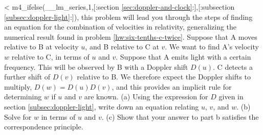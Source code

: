 <%
m4_ifelse(__lm_series,1,[:section \ref{sec:doppler-and-clock}:],[:subsection \ref{subsec:doppler-light}:]),
this problem will lead you through the steps of
finding an equation for the combination of velocities in relativity, generalizing the numerical result
found in problem \ref{hw:six-tenths-c-twice}. Suppose that A moves relative to B at velocity $u$,
and B relative to C at $v$. We want to find A's velocity $w$ relative to C, in terms of $u$ and $v$.
Suppose that A emits light with a certain frequency. This will be observed by B with a Doppler
shift $D(u)$. C detects a further shift of $D(v)$ relative to B. We therefore expect the Doppler
shifts to multiply, $D(w)=D(u)D(v)$, and this provides an implicit rule for determining $w$
if $u$ and $v$ are known. (a) Using the expression for $D$ given in section \ref{subsec:doppler-light},
write down an equation relating $u$, $v$, and $w$. (b) Solve for $w$ in terms of $u$ and $v$.
(c) Show that your answer to part b satisfies the correspondence principle.
